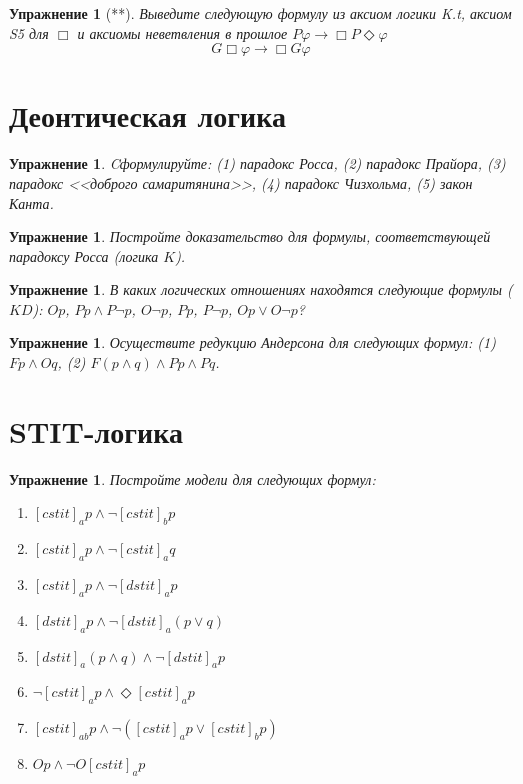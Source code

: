 \documentclass[11pt]{article}
\newtheorem{exercise}[theorem]{Упражнение}
\begin{document}
\begin{exercise}[**] Выведите следующую формулу из аксиом логики K.t, аксиом S5 для $\Box$ и аксиомы неветвления в прошлое $P \varphi \to \Box P \Diamond \varphi$
$$G \Box \varphi \to \Box G \varphi$$

\end{exercise}

\section{Деонтическая логика}
\begin{exercise} Cформулируйте:
(1) парадокс Росса,
(2) парадокс Прайора,
(3) парадокс <<доброго самаритянина>>,
(4) парадокс Чизхольма,
(5) закон Канта.
\end{exercise}

\begin{exercise} Постройте доказательство для формулы, соответствующей парадоксу Росса (логика $K$).
\end{exercise}

\begin{exercise} В каких логических отношениях находятся следующие формулы ($KD$): $Op$, $Pp \wedge P \neg p $, $O \neg p$, $Pp$, $P \neg p$, $Op \vee O \neg p$?
\end{exercise}

\begin{exercise} Осуществите редукцию Андерсона для следующих формул: (1) $Fp \wedge O q$, (2) $F (p \wedge q) \wedge Pp \wedge Pq$.	
\end{exercise}

\section{STIT-логика}
\begin{exercise} Постройте модели для следующих формул:
\begin{enumerate}
	\item $[cstit]_a p \wedge \neg [cstit]_b p$
	\item $[cstit]_a p \wedge \neg [cstit]_a q$
	\item $[cstit]_a p \wedge \neg [dstit]_a p$
	\item $[dstit]_a p \wedge \neg [dstit]_a (p \vee q)$
    \item $[dstit]_a (p \wedge q) \wedge \neg [dstit]_a p$
	\item $\neg [cstit]_a p \wedge \Diamond [cstit]_a p $
    \item $[cstit]_{ab} p \wedge \neg ([cstit]_a p \vee [cstit]_b p) $
    \item $Op \wedge \neg O [cstit]_a p $
\end{enumerate}

\end{exercise}
\end{document}
